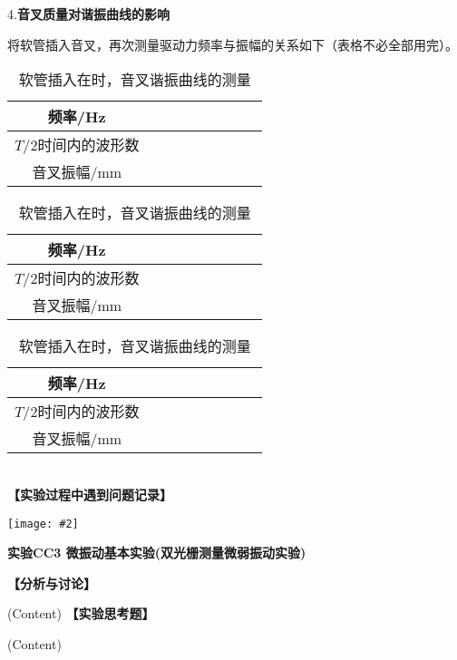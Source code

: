\documentclass[11pt,a4paper]{ctexart}
\newcommand{\ExpeName}{实验CC3 微振动基本实验(双光栅测量微弱振动实验)}
\newcommand{\cpic}[2]{
\begin{center}
\texttt{[image: \#2]}
\end{center}
}
\begin{document}
\\
\ 
\\
4.\textbf{音叉质量对谐振曲线的影响}\par
将软管插入音叉，再次测量驱动力频率与振幅的关系如下（表格不必全部用完）。
\begin{table}[h!]
\centering
\caption{软管插入在\uline{\hspace{45mm}}时，音叉谐振曲线的测量}
\begin{tabular}{|c|p{9mm}|p{9mm}|p{9mm}|p{9mm}|p{9mm}|p{9mm}|p{9mm}|p{9mm}|}
\hline
频率/Hz &  &  &  &  &  &  &  &  \\ \hline
$T/2$时间内的波形数 &  &  &  &  &  &  &  &  \\ \hline
音叉振幅/mm &  &  &  &  &  &  &  &  \\ \hline
\end{tabular}
\end{table}
\begin{table}[h!]
\centering
\caption{软管插入在\uline{\hspace{45mm}}时，音叉谐振曲线的测量}
\begin{tabular}{|c|p{9mm}|p{9mm}|p{9mm}|p{9mm}|p{9mm}|p{9mm}|p{9mm}|p{9mm}|}
\hline
频率/Hz &  &  &  &  &  &  &  &  \\ \hline
$T/2$时间内的波形数 &  &  &  &  &  &  &  &  \\ \hline
音叉振幅/mm &  &  &  &  &  &  &  &  \\ \hline
\end{tabular}
\end{table}
\begin{table}[h!]
\centering
\caption{软管插入在\uline{\hspace{45mm}}时，音叉谐振曲线的测量}
\begin{tabular}{|c|p{9mm}|p{9mm}|p{9mm}|p{9mm}|p{9mm}|p{9mm}|p{9mm}|p{9mm}|}
\hline
频率/Hz &  &  &  &  &  &  &  &  \\ \hline
$T/2$时间内的波形数 &  &  &  &  &  &  &  &  \\ \hline
音叉振幅/mm &  &  &  &  &  &  &  &  \\ \hline
\end{tabular}
\end{table}
\\
\textbf{【实验过程中遇到问题记录】}

%

\newpage%
\cpic{0.255}{e3}%
\begin{center}
\LARGE\textbf{{\ExpeName}}
\end{center}
\textbf{【分析与讨论】}\par
(Content)
\newline
\textbf{【实验思考题】}\par
(Content)
\end{document}

